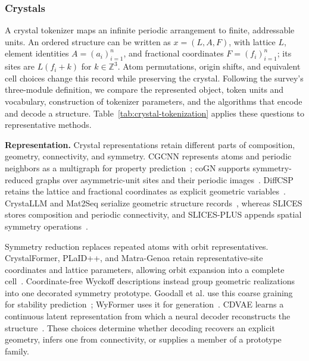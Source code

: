 \subsubsection{Crystals}
\label{sec:crystals}

A crystal tokenizer maps an infinite periodic arrangement to finite, addressable units. An ordered structure can be written as $x=(L,A,F)$, with lattice $L$, element identities $A=(a_i)_{i=1}^{n}$, and fractional coordinates $F=(f_i)_{i=1}^{n}$; its sites are $L(f_i+k)$ for $k\in\mathbb{Z}^{3}$. Atom permutations, origin shifts, and equivalent cell choices change this record while preserving the crystal. Following the survey's three-module definition, we compare the represented object, token units and vocabulary, construction of tokenizer parameters, and the algorithms that encode and decode a structure. Table~\ref{tab:crystal-tokenization} applies these questions to representative methods.

\textbf{Representation.}
Crystal representations retain different parts of composition, geometry, connectivity, and symmetry. CGCNN represents atoms and periodic neighbors as a multigraph for property prediction~\citep{xie2018cgcnn}; coGN supports symmetry-reduced graphs over asymmetric-unit sites and their periodic images~\citep{ruff2024cogn}. DiffCSP retains the lattice and fractional coordinates as explicit geometric variables~\citep{jiao2023diffcsp}. CrystaLLM and Mat2Seq serialize geometric structure records~\citep{antunes2024crystallm,yan2024mat2seq}, whereas SLICES stores composition and periodic connectivity, and SLICES-PLUS appends spatial symmetry operations~\citep{xiao2023slices,wang2025slicesplus}.

Symmetry reduction replaces repeated atoms with orbit representatives. CrystalFormer, PLaID++, and Matra-Genoa retain representative-site coordinates and lattice parameters, allowing orbit expansion into a complete cell~\citep{cao2025crystalformer,xu2026plaidpp,debreuck2026matragenoa}. Coordinate-free Wyckoff descriptions instead group geometric realizations into one decorated symmetry prototype. Goodall et al. use this coarse graining for stability prediction~\citep{goodall2022coarse}; WyFormer uses it for generation~\citep{kazeev2025wyformer}. CDVAE learns a continuous latent representation from which a neural decoder reconstructs the structure~\citep{xie2022cdvae}. These choices determine whether decoding recovers an explicit geometry, infers one from connectivity, or supplies a member of a prototype family.

